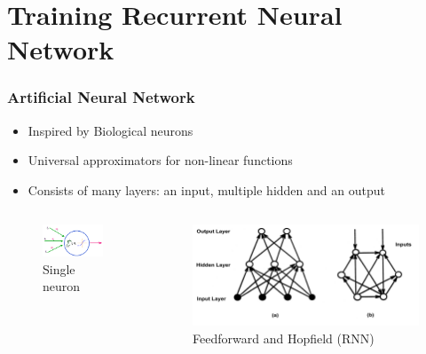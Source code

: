 \documentclass{beamer}
\begin{document}
\section{Training Recurrent Neural Network}
\begin{frame}[fragile]
  \frametitle{Artificial Neural Network}
  \begin{itemize}
    \item Inspired by Biological neurons
    \item Universal approximators for non-linear functions
    \item Consists of many layers: an input, multiple hidden and an output
  \end{itemize}
  \begin{columns}
  \begin{column}{0.4\textwidth}
  \begin{figure}
   \includegraphics[scale=0.3]{neuron}
   \caption{Single neuron}
  \end{figure}
  \end{column}
  \begin{column}{0.6\textwidth}
  \begin{figure}
   \includegraphics[scale=0.3]{nn}
   \caption{Feedforward and Hopfield (RNN)}
  \end{figure}
  \end{column}
  \end{columns}

\end{frame}
\end{document}
